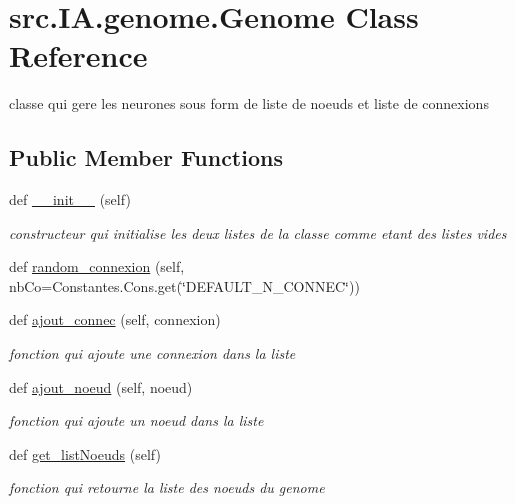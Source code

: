 \hypertarget{classsrc_1_1_i_a_1_1genome_1_1_genome}{}\section{src.\+I\+A.\+genome.\+Genome Class Reference}
\label{classsrc_1_1_i_a_1_1genome_1_1_genome}


classe qui gere les neurones sous form de liste de noeuds et liste de connexions  


\subsection*{Public Member Functions}
\begin{DoxyCompactItemize}
\item 
def \hyperlink{classsrc_1_1_i_a_1_1genome_1_1_genome_aa2ac658a0a10371801446a2631bd4cab}{\+\_\+\+\_\+init\+\_\+\+\_\+} (self)
\begin{DoxyCompactList}\small\item\em constructeur qui initialise les deux listes de la classe comme etant des listes vides \end{DoxyCompactList}\item 
def \hyperlink{classsrc_1_1_i_a_1_1genome_1_1_genome_a361c26903fa6bc978955402580c8d1b2}{random\+\_\+connexion} (self, nb\+Co=Constantes.\+Cons.\+get(\char`\"{}D\+E\+F\+A\+U\+L\+T\+\_\+\+N\+\_\+\+C\+O\+N\+N\+EC\char`\"{}))
\item 
def \hyperlink{classsrc_1_1_i_a_1_1genome_1_1_genome_ad69b8deb3d375fd6a7ed59d5af580e5c}{ajout\+\_\+connec} (self, connexion)
\begin{DoxyCompactList}\small\item\em fonction qui ajoute une connexion dans la liste \end{DoxyCompactList}\item 
def \hyperlink{classsrc_1_1_i_a_1_1genome_1_1_genome_a8af471d98e92b89554c1d8c529cbd9b6}{ajout\+\_\+noeud} (self, noeud)
\begin{DoxyCompactList}\small\item\em fonction qui ajoute un noeud dans la liste \end{DoxyCompactList}\item 
def \hyperlink{classsrc_1_1_i_a_1_1genome_1_1_genome_a03932bb05e9e56b789930f8462e8cbc3}{get\+\_\+list\+Noeuds} (self)
\begin{DoxyCompactList}\small\item\em fonction qui retourne la liste des noeuds du genome \end{DoxyCompactList}\item 

\end{DoxyCompactItemize}
